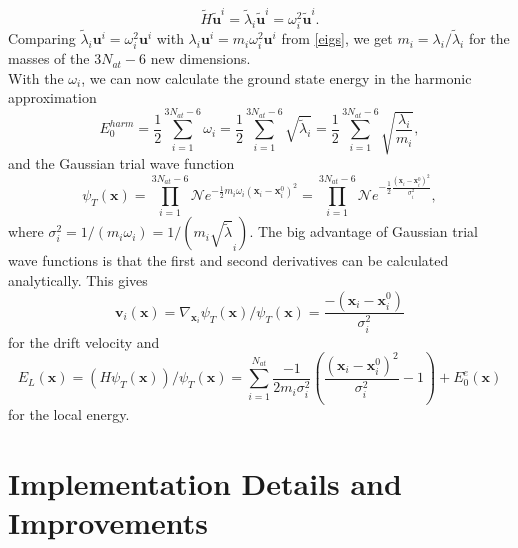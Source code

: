\documentclass [12pt]{report}
\begin{document}
\begin{equation}
\tilde{H} \bm{\tilde{u}}^i = \tilde{\lambda}_i \bm{\tilde{u}}^i = \omega_i^2 \bm{\tilde{u}}^i.
\end{equation}
Comparing $\tilde{\lambda}_i \bm{u}^i = \omega_i^2 \bm{u}^i$ with $\lambda_i \bm{u}^i = m_i \omega_i^2 \bm{u}^i$ from \eqref{eigs}, we get $m_i = \lambda_i / \tilde{\lambda}_i$ for the masses of the $3 N_{at} - 6$ new dimensions.\\
With the $\omega_i$, we can now calculate the ground state energy in the harmonic approximation
\begin{equation}
E_0^{harm} = \frac{1}{2} \sum_{i=1}^{3N_{at}-6} \omega_i = \frac{1}{2}\sum_{i=1}^{3N_{at}-6}  \sqrt{\tilde{\lambda}_i} = \frac{1}{2} \sum_{i=1}^{3N_{at}-6}  \sqrt{\frac{\lambda_i}{m_i}},
\end{equation}
and the Gaussian trial wave function
\begin{equation}
\psi_T(\bm{x}) = \prod_{i=1}^{3N_{at}-6} \mathcal{N} e^{-\frac{1}{2} m_i \omega_i (\bm{x}_i - \bm{x}^0_i)^2} = \prod_{i=1}^{3N_{at}-6} \mathcal{N} e^{-\frac{1}{2} \frac{(\bm{x}_i - \bm{x}^0_i)^2}{\sigma_i^2}},
\end{equation}
where $\sigma_i^2 = 1/(m_i \omega_i) = 1/(m_i\sqrt{\tilde{\lambda}}_i)$. 
The big advantage of Gaussian trial wave functions is that the first and second derivatives can be calculated analytically. This gives
\begin{equation}
\bm{v}_i(\bm{x}) = \nabla_{\bm{x}_i} \psi_T(\bm{x})/ \psi_T(\bm{x}) = \frac{-(\bm{x}_i - \bm{x}^0_i)}{\sigma_i^2}
\end{equation}
for the drift velocity and 
\begin{equation}\label{el}
E_L(\bm{x}) = (H\psi_T(\bm{x}))/\psi_T(\bm{x}) = \sum_{i=1}^{N_{at}} \frac{-1}{2m_i \sigma^2_i} \left( \frac{(\bm{x}_i - \bm{x}^0_i)^2}{\sigma^2_i} - 1 \right) + E_0^e(\bm{x})
\end{equation}
for the local energy. 
\section{Implementation Details and Improvements}
\end{document}
